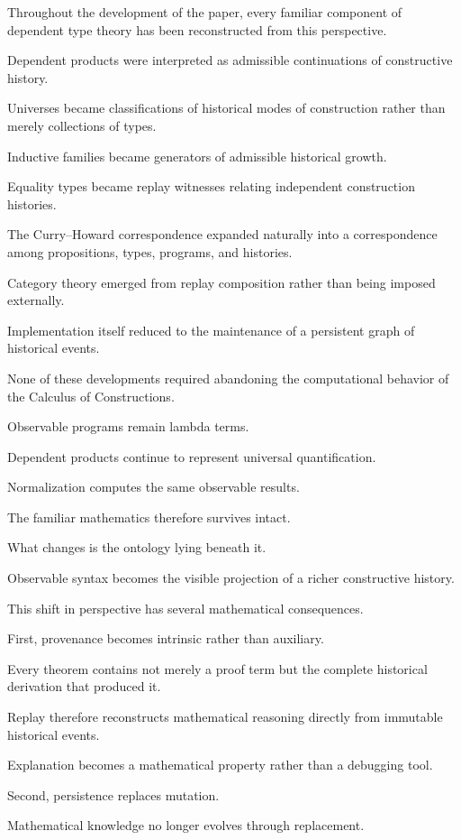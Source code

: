 \documentclass[12pt,oneside]{article}
\theoremstyle{definition}
\theoremstyle{remark}
\begin{document}
Throughout the development of the paper, every familiar component of dependent
type theory has been reconstructed from this perspective.

Dependent products were interpreted as admissible continuations of constructive
history.

Universes became classifications of historical modes of construction rather
than merely collections of types.

Inductive families became generators of admissible historical growth.

Equality types became replay witnesses relating independent construction
histories.

The Curry--Howard correspondence expanded naturally into a correspondence among
propositions, types, programs, and histories.

Category theory emerged from replay composition rather than being imposed
externally.

Implementation itself reduced to the maintenance of a persistent graph of
historical events.

None of these developments required abandoning the computational behavior of
the Calculus of Constructions.

Observable programs remain lambda terms.

Dependent products continue to represent universal quantification.

Normalization computes the same observable results.

The familiar mathematics therefore survives intact.

What changes is the ontology lying beneath it.

Observable syntax becomes the visible projection of a richer constructive
history.

This shift in perspective has several mathematical consequences.

First, provenance becomes intrinsic rather than auxiliary.

Every theorem contains not merely a proof term but the complete historical
derivation that produced it.

Replay therefore reconstructs mathematical reasoning directly from immutable
historical events.

Explanation becomes a mathematical property rather than a debugging tool.

Second, persistence replaces mutation.

Mathematical knowledge no longer evolves through replacement.
\end{document}
